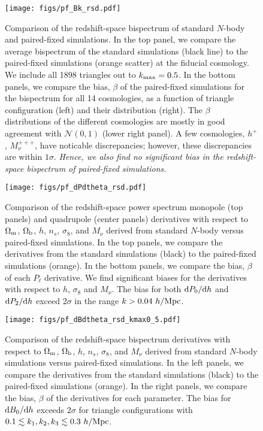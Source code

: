 \documentclass[12pt, letterpaper, preprint]{aastex62}
\newcommand{\Om}{\Omega_{\rm m}}
\newcommand{\Ob}{\Omega_{\rm b}}
\newcommand{\sig}{\sigma_8}
\newcommand{\mpc}{h/{\rm Mpc}}
\begin{document}
\begin{figure}
\begin{center}
    \texttt{[image: figs/pf\_Bk\_rsd.pdf]} 
    \caption{Comparison of the redshift-space bispectrum of standard $N$-body 
    and paired-fixed simulations. In the top panel, we compare the average 
    bispectrum of the standard simulations (black line) to the paired-fixed
    simulations (orange scatter) at the fiducial cosmology. We include all 
    1898 triangles out to $k_{\rm max} = 0.5$. In the bottom panels, we 
    compare the bias, $\beta$ of the paired-fixed simulations for the bispectrum 
    for all 14 cosmologies, as a function of triangle configuration (left) 
    and their distribution (right). The $\beta$ distributions of the different cosmologies are mostly in good 
    agreement with $\mathcal{N}(0,1)$ (lower right panel). A few cosmologies, 
    $h^+$, $M_\nu^{+++}$, have noticable discrepancies; however, these 
    discrepancies are within $1\sigma$. {\em Hence, we also find no significant 
    bias in the redshift-space bispectrum of paired-fixed simulations.}
    }
\label{fig:bk_rsd}
\end{center}
\end{figure}

\begin{figure}
\begin{center}
    \texttt{[image: figs/pf\_dPdtheta\_rsd.pdf]}
    \caption{Comparison of the redshift-space power spectrum monopole (top panels) 
    and quadrupole (center panels) derivatives with respect to $\Om$, $\Ob$, $h$, 
    $n_s$, $\sigma_8$, and $M_\nu$ derived from standard $N$-body versus 
    paired-fixed simulations. In the top panels, we compare the derivatives from 
    the standard simulations (black) to the paired-fixed simulations (orange). 
    In the bottom panels, we compare the bias, $\beta$ of each $P_\ell$ derivative. 
    We find significant biases for the derivatives with respect to $h$, $\sig$ and 
    $M_\nu$. The bias for both ${\rm d} P_0/{\rm d}h$ and ${\rm d} P_2/{\rm d}h$ exceed 
    $2\sigma$ in the range $k > 0.04~\mpc$.} 
\label{fig:dpk_rsd}
\end{center}
\end{figure}

\begin{figure}
\begin{center}
    \texttt{[image: figs/pf\_dBdtheta\_rsd\_kmax0\_5.pdf]}
    \caption{Comparison of the redshift-space bispectrum derivatives with respect
    to $\Om$, $\Ob$, $h$, $n_s$, $\sigma_8$, and $M_\nu$ derived from standard 
    $N$-body simulations versus paired-fixed simulations. In the left panels, we 
    compare the derivatives from the standard simulations (black) to the paired-fixed
    simulations (orange). In the right panels, we compare the bias, $\beta$ of
    the derivatives for each parameter. The bias for ${\rm d} B_0/{\rm d}h$ exceeds 
    $2\sigma$ for triangle configurations with $0.1 \lesssim k_1, k_2, k_3 \lesssim 0.3~\mpc$.}
\label{fig:dbk_rsd}
\end{center}
\end{figure}
\end{document}
